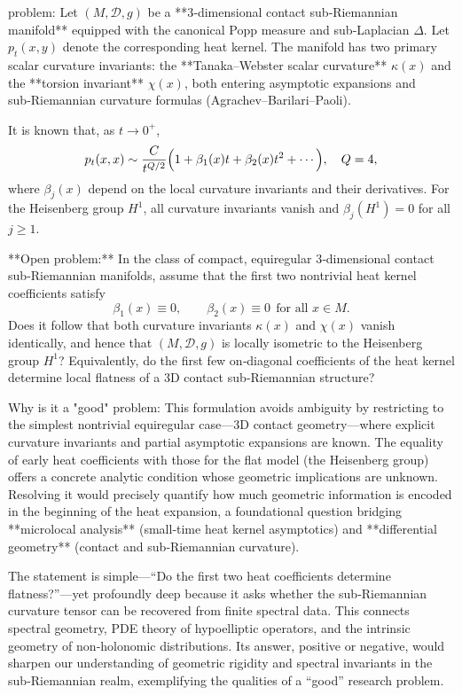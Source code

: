 problem:  
Let \((M,\mathcal{D},g)\) be a **3‑dimensional contact sub‑Riemannian manifold** equipped with the canonical Popp measure and sub‑Laplacian \(\Delta\). Let \(p_t(x,y)\) denote the corresponding heat kernel. The manifold has two primary scalar curvature invariants: the **Tanaka–Webster scalar curvature** \(\kappa(x)\) and the **torsion invariant** \(\chi(x)\), both entering asymptotic expansions and sub‑Riemannian curvature formulas (Agrachev–Barilari–Paoli).  

It is known that, as \(t\to 0^+\),
\[
p_t(x,x)\sim \frac{C}{t^{Q/2}}\Bigl(1+\beta_1(x)t+\beta_2(x)t^2+\cdots\Bigr),\quad Q=4,
\]
where \(\beta_j(x)\) depend on the local curvature invariants and their derivatives. For the Heisenberg group \(H^1\), all curvature invariants vanish and \(\beta_j(H^1)=0\) for all \(j\ge1\).  

**Open problem:**  
In the class of compact, equiregular 3‑dimensional contact sub‑Riemannian manifolds, assume that the first two nontrivial heat kernel coefficients satisfy
\[
\beta_1(x)\equiv 0,\qquad \beta_2(x)\equiv 0 \ \ \text{for all } x\in M.
\]
Does it follow that both curvature invariants \(\kappa(x)\) and \(\chi(x)\) vanish identically, and hence that \((M,\mathcal{D},g)\) is locally isometric to the Heisenberg group \(H^1\)?  
Equivalently, do the first few on‑diagonal coefficients of the heat kernel determine local flatness of a 3D contact sub‑Riemannian structure?

Why is it a "good" problem:  
This formulation avoids ambiguity by restricting to the simplest nontrivial equiregular case—3D contact geometry—where explicit curvature invariants and partial asymptotic expansions are known. The equality of early heat coefficients with those for the flat model (the Heisenberg group) offers a concrete analytic condition whose geometric implications are unknown. Resolving it would precisely quantify how much geometric information is encoded in the beginning of the heat expansion, a foundational question bridging **microlocal analysis** (small‑time heat kernel asymptotics) and **differential geometry** (contact and sub‑Riemannian curvature).  

The statement is simple—“Do the first two heat coefficients determine flatness?”—yet profoundly deep because it asks whether the sub‑Riemannian curvature tensor can be recovered from finite spectral data. This connects spectral geometry, PDE theory of hypoelliptic operators, and the intrinsic geometry of non‑holonomic distributions. Its answer, positive or negative, would sharpen our understanding of geometric rigidity and spectral invariants in the sub‑Riemannian realm, exemplifying the qualities of a “good” research problem.